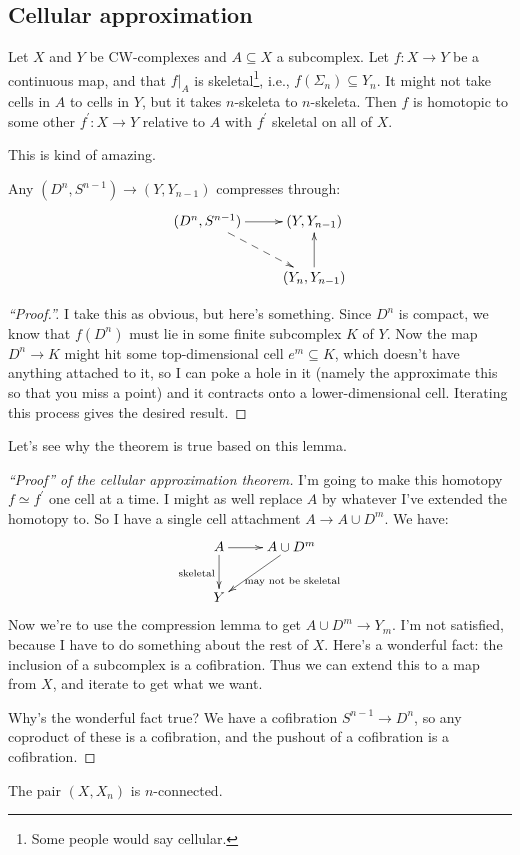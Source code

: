 \subsection{Cellular approximation}
\begin{theorem}
    Let $X$ and $Y$ be CW-complexes and $A\subseteq X$ a subcomplex. Let $f:X\to Y$ be a continuous map, and that $f|_{A}$ is skeletal\footnote{Some people would say cellular.}, i.e., $f(\Sigma_n)\subseteq Y_n$. It might not take cells in $A$ to cells in $Y$, but it takes $n$-skeleta to $n$-skeleta. Then $f$ is homotopic to some other $f^\prime:X\to Y$ relative to $A$ with $f^\prime$ skeletal on all of $X$.
\end{theorem}
This is kind of amazing.
\begin{lemma}
    Any $(D^n,S^{n-1})\to (Y,Y_{n-1})$ compresses through:
    \begin{equation*}
	\xymatrix{
	(D^n,S^{n-1})\ar[r]\ar@{-->}[dr] & (Y,Y_{n-1})\\
	& (Y_n,Y_{n-1})\ar[u]
	}
    \end{equation*}
\end{lemma}
\begin{proof}[``Proof.'']
    I take this as obvious, but here's something. Since $D^n$ is compact, we know that $f(D^n)$ must lie in some finite subcomplex $K$ of $Y$. Now the map $D^n\to K$ might hit some top-dimensional cell $e^m\subseteq K$, which doesn't have anything attached to it, so I can poke a hole in it (namely the approximate this so that you miss a point) and it contracts onto a lower-dimensional cell. Iterating this process gives the desired result.
\end{proof}
Let's see why the theorem is true based on this lemma.
\begin{proof}[``Proof'' of the cellular approximation theorem]
    I'm going to make this homotopy $f\simeq f^\prime$ one cell at a time. I might as well replace $A$ by whatever I've extended the homotopy to. So I have a single cell attachment $A\to A\cup D^m$. We have:
    \begin{equation*}
	\xymatrix{
	A\ar[d]_{\text{skeletal}}\ar[r] & A\cup D^m\ar[dl]^{\text{may not be skeletal}}\\
	Y &
	}
    \end{equation*}
    Now we're to use the compression lemma to get $A\cup D^m\to Y_m$. I'm not satisfied, because I have to do something about the rest of $X$. Here's a wonderful fact: the inclusion of a subcomplex is a cofibration. Thus we can extend this to a map from $X$, and iterate to get what we want.

    Why's the wonderful fact true? We have a cofibration $S^{n-1}\to D^n$, so any coproduct of these is a cofibration, and the pushout of a cofibration is a cofibration.
\end{proof}
\begin{corollary}[Homework]
    The pair $(X,X_n)$ is $n$-connected.
\end{corollary}
